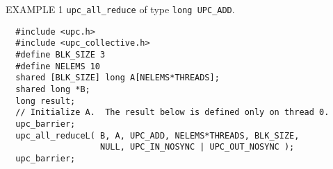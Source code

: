 \documentclass[12pt,titlepage]{article}
\newcounter{parnum}
\newcommand\np{\addtocounter{parnum}{1}\hspace{-2em}\makebox[2em][l]{\arabic{parnum}}}
\begin{document}
\np EXAMPLE 1 {\tt upc\_all\_reduce} of type {\tt long UPC\_ADD}.
\begin{verbatim}
  #include <upc.h>
  #include <upc_collective.h>
  #define BLK_SIZE 3
  #define NELEMS 10
  shared [BLK_SIZE] long A[NELEMS*THREADS];
  shared long *B;
  long result;
  // Initialize A.  The result below is defined only on thread 0.
  upc_barrier;
  upc_all_reduceL( B, A, UPC_ADD, NELEMS*THREADS, BLK_SIZE,
                   NULL, UPC_IN_NOSYNC | UPC_OUT_NOSYNC );
  upc_barrier;
\end{verbatim}

%
%
%
%
%
\end{document}
